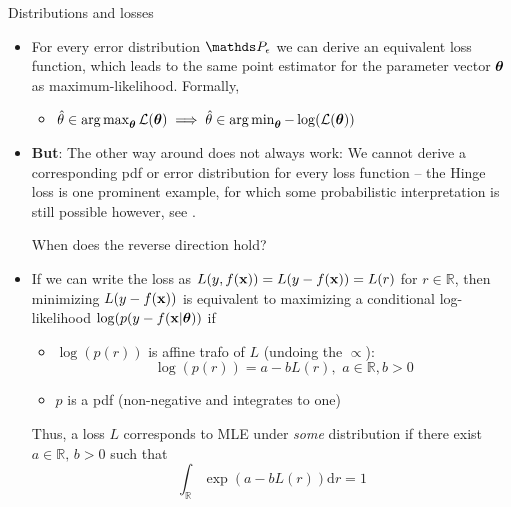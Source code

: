 \documentclass[11pt,compress,t,notes=noshow, xcolor=table]{beamer}
\begin{document}
\begin{vbframe}{Distributions and losses}

\begin{itemize} 
\item For every error distribution $\P_\eps$ we can derive an equivalent loss function, which leads to the same point estimator for the parameter vector $\bm{\theta}$ as maximum-likelihood. Formally,
\begin{itemize}
    \item $\hat{\theta} \in \operatorname*{arg\,max}_{\bm{\theta}} \mathcal{L}(\bm{\theta}) \implies \hat{\theta} \in \operatorname*{arg\,min}_{\bm{\theta}}-\log(\mathcal{L}(\bm{\theta}))$  %
\end{itemize}
\item \textbf{But}: The other way around does not always work: We cannot derive a corresponding pdf or error distribution for every loss function -- the Hinge loss is one prominent example, for which some probabilistic interpretation is still possible however, see .

\framebreak

When does the reverse direction hold?
\item If we can write the loss as $L(y,f(\mathbf{x}))=L(y-f(\mathbf{x}))=L(r)$ for $r \in \mathbb{R}$, then minimizing $L(y-f(\mathbf{x}))$ is equivalent to maximizing a conditional log-likelihood $\log(p(y-f(\mathbf{x}|\bm{\theta}))$ if
\begin{itemize}
 \setlength{\itemsep}{1.2em}
    \item $\log(p(r))$ is affine trafo of $L$ (undoing the $\propto$):
    $$\log(p(r)) = a - bL(r),\,\,a \in \mathbb{R}, b>0$$
    \item  $p$ is a pdf (non-negative and integrates to one)
\end{itemize}
\lz
Thus, a loss $L$ corresponds to MLE under \textit{some} distribution if there exist $a \in \mathbb{R},\, b>0$ such that
$$ \int_{\mathbb{R}} \exp(a-bL(r))\text{d}r = 1$$
\end{itemize}
    
\end{vbframe}


\endlecture
\end{document}
